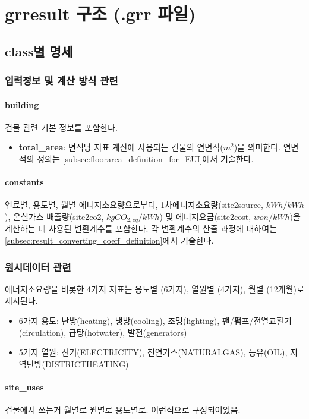 \section{grresult 구조 (.grr 파일)}
\subsection{class별 명세}
\subsubsection{입력정보 및 계산 방식 관련}
\paragraph{building} 건물 관련 기본 정보를 포함한다.
\begin{itemize}
  \item \textbf{total\_area}: 면적당 지표 계산에 사용되는 건물의 연면적($m^2$)을 의미한다. 연면적의 정의는 \ref{subsec:floorarea_definition_for_EUI}에서 기술한다.
\end{itemize}

\paragraph{constants} 연료별, 용도별, 월별 에너지소요량으로부터, 1차에너지소요량(site2source, $kWh/kWh$), 온실가스 배출량(site2co2, $kgCO_{2,eq}/kWh$) 및 에너지요금(site2cost, $won/kWh$)을 계산하는 데 사용된 변환계수를 포함한다. 각 변환계수의 산출 과정에 대하여는 \ref{subsec:result_converting_coeff_definition}에서 기술한다.

\subsubsection{원시데이터 관련}
에너지소요량을 비롯한 4가지 지표는 용도별 (6가지), 열원별 (4가지), 월별 (12개월)로 제시된다.
\begin{itemize}
  \item 6가지 용도: 난방(heating), 냉방(cooling), 조명(lighting), 팬/펌프/전열교환기(circulation), 급탕(hotwater), 발전(generators)
  \item 5가지 열원: 전기(ELECTRICITY), 천연가스(NATURALGAS), 등유(OIL), 지역난방(DISTRICTHEATING)
\end{itemize}

\paragraph{site\_uses} 건물에서 쓰는거 월별로 원별로 용도별로. 이런식으로 구성되어있음.
